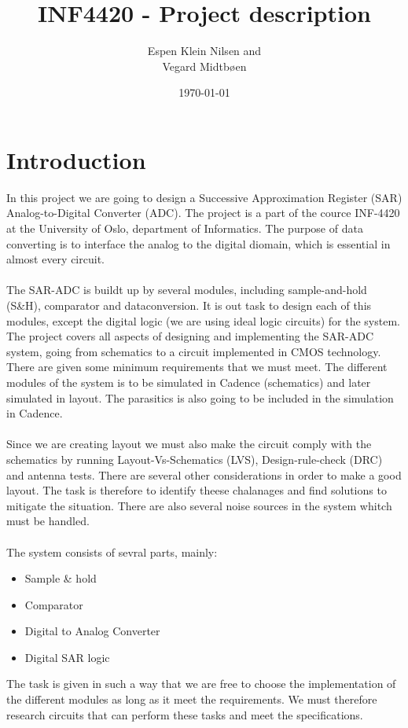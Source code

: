 \documentclass[english, 12pt, a4paper]{ifimaster}
\title{INF4420 - Project description}
\author{Espen Klein Nilsen and\\
	Vegard Midtbøen}
\date{\today}
\begin{document}
 \maketitle
 
\section*{Introduction}
In this project we are going to design a Successive Approximation Register (SAR) Analog-to-Digital Converter (ADC). The project is a part 
of the cource INF-4420 at the University of Oslo, department of Informatics. The purpose of data converting is to interface the analog to the 
digital diomain, which is essential in almost every circuit.\\
\\
The SAR-ADC is buildt up by several modules, including sample-and-hold (S\&H), comparator and dataconversion. It is out task to design each of this modules, except the digital logic 
(we are using ideal logic circuits) for the system. The project covers all aspects of designing and implementing the SAR-ADC system, going from schematics to a circuit implemented in 
CMOS technology. There are given some minimum requirements that we must meet. The different modules of the system is to be simulated in Cadence (schematics) and later simulated in layout. 
The parasitics is also going to be included in the simulation in Cadence.\\
\\
Since we are creating layout we must also make the circuit comply with the schematics by running Layout-Vs-Schematics (LVS), Design-rule-check (DRC) and antenna tests. 
There are several other considerations in order to make a good layout. The task is therefore to identify theese chalanages and find solutions to mitigate the situation. 
There are also several noise sources in the system whitch must be handled.\\
\\
The system consists of sevral parts, mainly:
\begin{itemize}
 \item Sample \& hold
 \item Comparator
 \item Digital to Analog Converter
 \item Digital SAR logic
\end{itemize}
The task is given in such a way that we are free to choose the implementation of the different modules as long as it meet the requirements. 
We must therefore research circuits that can perform these tasks and meet the specifications. 
\end{document}
